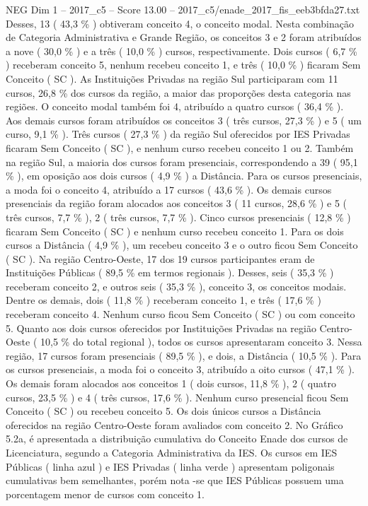 \begin{textsample}{NEG Dim 1 – 2017\_c5 – Score 13.00 – 2017\_c5/enade\_2017\_fis\_eeb3bfda27.txt}
Desses, 13 ( 43,3 \% ) obtiveram conceito 4, o conceito modal.
Nesta combinação de Categoria Administrativa e Grande Região, os conceitos 3 e 2 foram atribuídos a nove ( 30,0 \% ) e a três ( 10,0 \% ) cursos, respectivamente.
Dois cursos ( 6,7 \% ) receberam conceito 5, nenhum recebeu conceito 1, e três ( 10,0 \% ) ficaram Sem Conceito ( SC ).
As Instituições Privadas na região Sul participaram com 11 cursos, 26,8 \% dos cursos da região, a maior das proporções desta categoria nas regiões.
O conceito modal também foi 4, atribuído a quatro cursos ( 36,4 \% ).
Aos demais cursos foram atribuídos os conceitos 3 ( três cursos, 27,3 \% ) e 5 ( um curso, 9,1 \% ).
Três cursos ( 27,3 \% ) da região Sul oferecidos por IES Privadas ficaram Sem Conceito ( SC ), e nenhum curso recebeu conceito 1 ou 2.
Também na região Sul, a maioria dos cursos foram presenciais, correspondendo a 39 ( 95,1 \% ), em oposição aos dois cursos ( 4,9 \% ) a Distância.
Para os cursos presenciais, a moda foi o conceito 4, atribuído a 17 cursos ( 43,6 \% ).
Os demais cursos presenciais da região foram alocados aos conceitos 3 ( 11 cursos, 28,6 \% ) e 5 ( três cursos, 7,7 \% ), 2 ( três cursos, 7,7 \% ).
Cinco cursos presenciais ( 12,8 \% ) ficaram Sem Conceito ( SC ) e nenhum curso recebeu conceito 1.
Para os dois cursos a Distância ( 4,9 \% ), um recebeu conceito 3 e o outro ficou Sem Conceito ( SC ).
Na região Centro-Oeste, 17 dos 19 cursos participantes eram de Instituições Públicas ( 89,5 \% em termos regionais ).
Desses, seis ( 35,3 \% ) receberam conceito 2, e outros seis ( 35,3 \% ), conceito 3, os conceitos modais.
Dentre os demais, dois ( 11,8 \% ) receberam conceito 1, e três ( 17,6 \% ) receberam conceito 4.
Nenhum curso ficou Sem Conceito ( SC ) ou com conceito 5.
Quanto aos dois cursos oferecidos por Instituições Privadas na região Centro-Oeste ( 10,5 \% do total regional ), todos os cursos apresentaram conceito 3.
Nessa região, 17 cursos foram presenciais ( 89,5 \% ), e dois, a Distância ( 10,5 \% ).
Para os cursos presenciais, a moda foi o conceito 3, atribuído a oito cursos ( 47,1 \% ).
Os demais foram alocados aos conceitos 1 ( dois cursos, 11,8 \% ), 2 ( quatro cursos, 23,5 \% ) e 4 ( três cursos, 17,6 \% ).
Nenhum curso presencial ficou Sem Conceito ( SC ) ou recebeu conceito 5.
Os dois únicos cursos a Distância oferecidos na região Centro-Oeste foram avaliados com conceito 2.
No Gráfico 5.2a, é apresentada a distribuição cumulativa do Conceito Enade dos cursos de Licenciatura, segundo a Categoria Administrativa da IES.
Os cursos em IES Públicas ( linha azul ) e IES Privadas ( linha verde ) apresentam poligonais cumulativas bem semelhantes, porém nota -se que IES Públicas possuem uma porcentagem menor de cursos com conceito 1.

\end{textsample}
